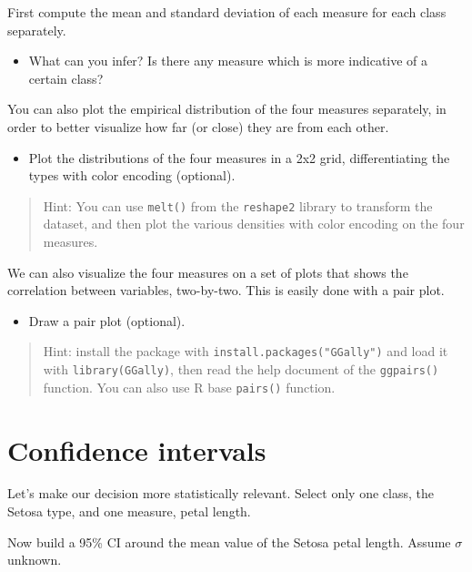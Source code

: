 \documentclass[
  oneside]{book}
\providecommand{\tightlist}{%
  \setlength{\itemsep}{0pt}\setlength{\parskip}{0pt}}
\begin{document}
First compute the mean and standard deviation of each measure for each
class separately.

\begin{itemize}
\tightlist
\item
  What can you infer? Is there any measure which is more indicative of a certain class?
\end{itemize}

You can also plot the empirical distribution of the four measures
separately, in order to better visualize how far (or close) they
are from each other.

\begin{itemize}
\tightlist
\item
  Plot the distributions of the four measures in a 2x2
  grid, differentiating the types with color encoding (optional).
\end{itemize}

\begin{quote}
Hint: You can use \texttt{melt()} from the \texttt{reshape2} library to
transform the dataset, and then plot the various densities with
color encoding on the four measures.
\end{quote}

We can also visualize the four measures on a set of plots that shows
the correlation between variables, two-by-two. This is easily
done with a pair plot.

\begin{itemize}
\tightlist
\item
  Draw a pair plot (optional).
\end{itemize}

\begin{quote}
Hint: install the package with \texttt{install.packages("GGally")} and load it with \texttt{library(GGally)}, then
read the help document of the \texttt{ggpairs()} function. You can also use R base \texttt{pairs()} function.
\end{quote}

\hypertarget{confidence-intervals-1}{%
\section{Confidence intervals}\label{confidence-intervals-1}}

Let's make our decision more statistically relevant.
Select only one class, the Setosa type, and one measure, petal length.

Now build a 95\% CI around the mean value of the Setosa petal length.
Assume \(\sigma\) unknown.
\end{document}
